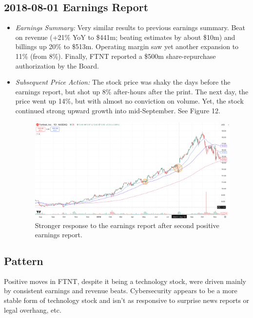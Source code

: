\documentclass[11pt]{article}
\begin{document}
    \subsection{2018-08-01 Earnings Report}
        \begin{itemize}
            \item \textit{Earnings Summary:} Very similar results to previous earnings summary. Beat on revenue (+21\% YoY to \$441m; beating estimates by about \$10m) and billings up 20\% to \$513m. Operating margin saw yet another expansion to 11\% (from 8\%). Finally, FTNT reported a \$500m share-repurchase authorization by the Board.
            \item \textit{Subsequent Price Action:} The stock price was shaky the days before the earnings report, but shot up 8\% after-hours after the print. The next day, the price went up 14\%, but with almost no conviction on volume. Yet, the stock continued strong upward growth into mid-September. See Figure 12.
            \begin{figure}[h]
                \centering \includegraphics[width=0.8\linewidth]{images/FTNT2.png}
                \caption{Stronger response to the earnings report after second positive earnings report.}
            \end{figure}
        \end{itemize}
    \subsection{Pattern}
        Positive moves in FTNT, despite it being a technology stock, were driven mainly by consistent earnings and revenue beats. Cybersecurity appears to be a more stable form of technology stock and isn't as responsive to surprise news reports or legal overhang, etc.
\end{document}
